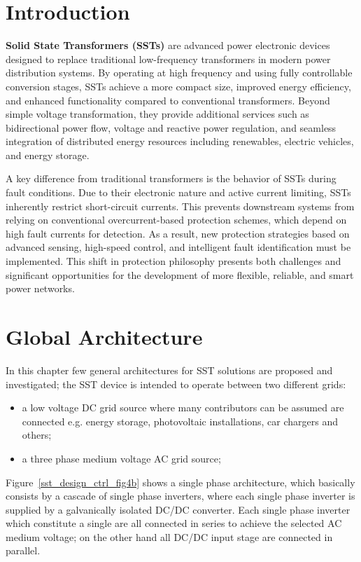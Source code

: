 \documentclass[12pt,a4paper]{scrartcl}
\begin{document}
\begin{onehalfspace}
\section{Introduction}
\textbf{Solid State Transformers (SSTs)} are advanced power electronic devices designed to replace traditional low-frequency transformers in modern power distribution systems. By operating at high frequency and using fully controllable conversion stages, SSTs achieve a more compact size, improved energy efficiency, and enhanced functionality compared to conventional transformers. Beyond simple voltage transformation, they provide additional services such as bidirectional power flow, voltage and reactive power regulation, and seamless integration of distributed energy resources including renewables, electric vehicles, and energy storage.

A key difference from traditional transformers is the behavior of SSTs during fault conditions. Due to their electronic nature and active current limiting, SSTs inherently restrict short-circuit currents. This prevents downstream systems from relying on conventional overcurrent-based protection schemes, which depend on high fault currents for detection. As a result, new protection strategies based on advanced sensing, high-speed control, and intelligent fault identification must be implemented. This shift in protection philosophy presents both challenges and significant opportunities for the development of more flexible, reliable, and smart power networks.

\section{Global Architecture}
In this chapter few general architectures for SST solutions are proposed and investigated; the SST device is intended to operate between two different grids:
\begin{itemize}
	\item[--] a low voltage DC grid source where many contributors can be assumed are connected e.g. energy storage, photovoltaic installations, car chargers and others;
	\item[--] a three phase medium voltage AC grid source;	 
\end{itemize} 

\noindent Figure~\ref{sst_design_ctrl_fig4b} shows a single phase architecture, which basically consists by a cascade of single phase inverters, where each single phase inverter is supplied by a galvanically isolated DC/DC converter. Each single phase inverter which constitute a single are all connected in series to achieve the selected AC medium voltage; on the other hand all DC/DC input stage are connected in parallel.


\end{onehalfspace}
\end{document}

